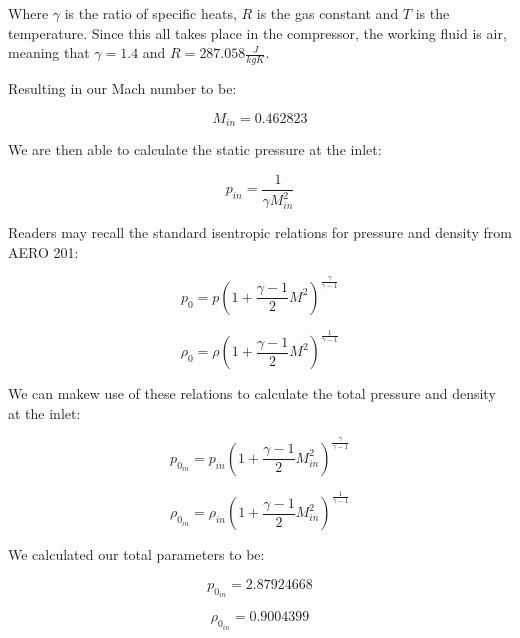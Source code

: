 \documentclass[12pt,english]{article}
\begin{document}
Where $\gamma$ is the ratio of specific heats, $R$ is the gas constant and $T$ is the temperature.
Since this all takes place in the compressor, the working fluid is air, meaning that $\gamma = 1.4$
and $R = 287.058 \frac{J}{kgK}$.

Resulting in our Mach number to be:

\begin{equation}
\label{eq:mach}
M_{in} = 0.462823
\end{equation}

We are then able to calculate the static pressure at the inlet:

\begin{equation}
\label{eq:inlet pressure}
p_{in} = \frac{1}{\gamma M_{in}^2}
\end{equation}

Readers may recall the standard isentropic relations for pressure and density from AERO 201:

\begin{equation}
\label{eq:isentropic pressure}
p_{0} = p \left( 1 + \frac{\gamma-1}{2} M^{2} \right)^{\frac{\gamma}{\gamma - 1}}
\end{equation}

\begin{equation}
\label{eq:isentropic density}
\rho_{0} = \rho \left( 1 + \frac{\gamma-1}{2} M^{2} \right)^{\frac{1}{\gamma - 1}}
\end{equation}

We can makew use of these relations to calculate the total pressure and density at the inlet:

\begin{equation}
\label{eq:total pressure}
p_{0_{in}} = p_{in} \left( 1 + \frac{\gamma-1}{2} M_{in}^{2} \right)^{\frac{\gamma}{\gamma - 1}}
\end{equation}

\begin{equation}
\label{eq:total density}
\rho_{0_{in}} = \rho_{in} \left( 1 + \frac{\gamma-1}{2} M_{in}^{2} \right)^{\frac{1}{\gamma - 1}}
\end{equation}

We calculated our total parameters to be:

\begin{equation}
\label{eq:total pressure}
p_{0_{in}} = 2.87924668
\end{equation}

\begin{equation}
\label{eq:total density}
\rho_{0_{in}} = 0.9004399
\end{equation}
\end{document}
